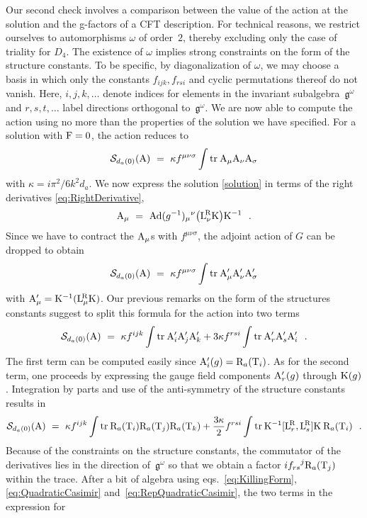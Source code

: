 \documentclass[12pt,a4paper]{article}
\newcommand{\tr}{\text{tr}}
\newcommand{\mf}{\mathfrak} %
\def\ig{\mf{g}^\omega} %
\def\tT{{\rm T}} %
\def\tR{{\rm R}} %
\def\tK{{\rm K}} %
\def\cS{{\mathcal S}}
\def\tF{{\rm F}}
\def\tA{{\rm A}}
\def\tL{{\rm L}}
\def\Ad{{\rm Ad}}
\begin{document}
Our second check involves a comparison between the value of the action 
at the solution and the g-factors of a CFT description. For technical 
reasons, we restrict ourselves to automorphisms $\omega$ of order~$2$, 
thereby excluding only the case of triality for $D_4$. The existence of
$\omega$ 
implies strong constraints on the form of the structure constants. To 
be specific, by diagonalization of $\omega$, we may choose a basis 
in which only the constants $f_{ijk}, f_{rsi}$ and cyclic permutations 
thereof do not vanish. Here, $i,j,k,\ldots$ denote indices for elements 
in the invariant subalgebra~$\ig$ and $r,s,t,\ldots$ label directions 
orthogonal to~$\ig$. We are now able to compute 
the action using no more than the properties of the solution we have 
specified. For a solution with $\tF =0$, the action reduces to
\[
\cS_{d_a(0)}(\tA) \ = \ \kappa f^{\mu \nu \sigma }\int\tr\:\tA_\mu
\tA_\nu \tA_\sigma 
\]
with $\kappa = i \pi^2/ 6k^2 d_a$. We now express the solution 
\eqref{solution} in terms of the right derivatives
\eqref{eq:RightDerivative}, 
$$
  \tA_{\mu }\ =\ \Ad
   (g^{-1}){_{\mu }}^{\nu }\bigl(\tL^{\!\tR }_{\nu }
 \tK\bigr)\tK^{-1}\ \ . 
$$
Since we have to contract the $\tA_\mu$s with $f^{\mu \nu \sigma }$, 
the adjoint action of $G$ can be dropped to obtain 
\[
\cS_{d_a(0)}(\tA) \ = \ \kappa f^{\mu \nu \sigma }\int\tr\:\tA'_\mu
\tA'_\nu \tA'_\sigma
\]
with $\tA '_{\mu }=\tK^{-1}(\tL ^{\!\tR }_{\mu }\tK)$. Our previous
remarks on the form of the structures constants suggest to split this
formula for the action into two terms 
\begin{equation}
  \label{eq:AuxAction}
  \cS_{d_a(0)}(\tA) \ = \ \kappa f^{ijk}\int\tr\:\tA'_i\tA'_j\tA'_k
   +3 \kappa f^{rsi}\int\tr\:\tA'_r\tA'_s\tA'_i\ \ .
\end{equation}
The first term can be computed 
easily since $\tA'_{i}(g)=\tR_a(\tT_i)$. 
As for the second term, one proceeds by expressing the gauge field
components $\tA'_r(g)$ through $\tK(g)$. Integration by parts and 
use of the anti-symmetry of the structure constants results in 
$$ \cS_{d_a(0)} (\tA) \ = \ \kappa f^{ijk}\int\tr\:
   \tR_a(\tT_i)\tR_a(\tT_j)\tR_a(\tT_k)
   +\frac{3\kappa }{2} 
   f^{rsi}\int\tr\: \tK^{-1}[\tL^{\!\tR }_r,\tL^{\!\tR }_s]\tK\:\tR_a(\tT_i)
\ \ . $$ 
Because of the constraints on the structure constants, the commutator 
of the derivatives lies in the direction of~$\ig$ so that we obtain 
a factor $i{f_{rs}}^j\tR_a(\tT_j)$ within the trace. After a bit of algebra 
using eqs.~\eqref{eq:KillingForm}, \eqref{eq:QuadraticCasimir} 
and~\eqref{eq:RepQuadraticCasimir}, the two terms in the expression for 
\end{document}
